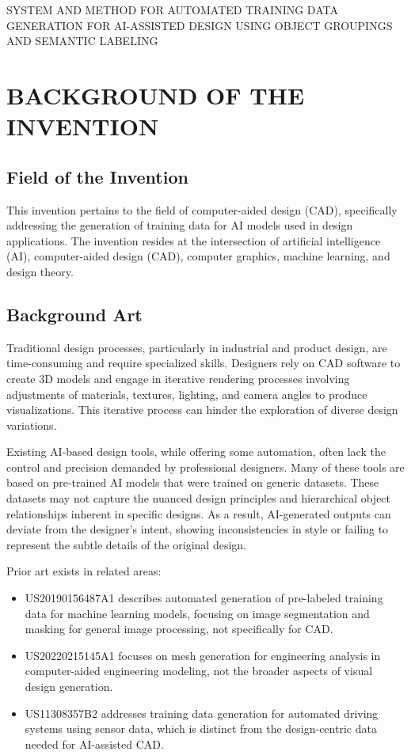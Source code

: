 \documentclass[12pt]{article}
\begin{document}
\begin{center}
{\Large SYSTEM AND METHOD FOR AUTOMATED TRAINING DATA GENERATION FOR AI-ASSISTED DESIGN USING OBJECT GROUPINGS AND SEMANTIC LABELING}
\end{center}

\vspace{24pt}

\section{BACKGROUND OF THE INVENTION}

\subsection{Field of the Invention}
This invention pertains to the field of computer-aided design (CAD), specifically addressing the generation of training data for AI models used in design applications. The invention resides at the intersection of artificial intelligence (AI), computer-aided design (CAD), computer graphics, machine learning, and design theory.

\subsection{Background Art}
Traditional design processes, particularly in industrial and product design, are time-consuming and require specialized skills. Designers rely on CAD software to create 3D models and engage in iterative rendering processes involving adjustments of materials, textures, lighting, and camera angles to produce visualizations. This iterative process can hinder the exploration of diverse design variations.

Existing AI-based design tools, while offering some automation, often lack the control and precision demanded by professional designers. Many of these tools are based on pre-trained AI models that were trained on generic datasets. These datasets may not capture the nuanced design principles and hierarchical object relationships inherent in specific designs. As a result, AI-generated outputs can deviate from the designer's intent, showing inconsistencies in style or failing to represent the subtle details of the original design.

Prior art exists in related areas:
\begin{itemize}
    \item US20190156487A1 describes automated generation of pre-labeled training data for machine learning models, focusing on image segmentation and masking for general image processing, not specifically for CAD.
    \item US20220215145A1 focuses on mesh generation for engineering analysis in computer-aided engineering modeling, not the broader aspects of visual design generation. 
    \item US11308357B2 addresses training data generation for automated driving systems using sensor data, which is distinct from the design-centric data needed for AI-assisted CAD.
\end{itemize}
\end{document}
